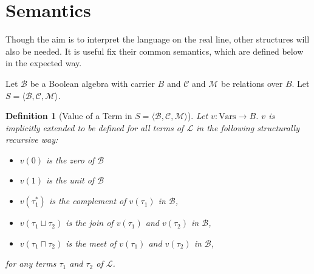 \documentclass{article}
\newtheorem*{definition}{Definition}
\newcommand{\B}{\mathcal{B}}
\newcommand{\lang}{\mathcal{L}}
\newcommand{\Vars}{\text{Vars}}
\newcommand{\lcup}{\sqcup}
\newcommand{\lcap}{\sqcap}
\newcommand{\lstar}{^*}
\begin{document}
\section{Semantics}

Though the aim is to interpret the language on the real line, other structures will also be needed. It is useful fix their common semantics, which are defined below in the expected way.

Let $\B$ be a Boolean algebra with carrier $B$ and $\mathcal{C}$ and $\mathcal{M}$ be relations over $B$. Let $S = \langle \B, \mathcal{C}, \mathcal{M} \rangle$.

\begin{definition}[Value of a Term in $S = \langle \B, \mathcal{C}, \mathcal{M} \rangle$]
  Let $v: \Vars \rightarrow B$. $v$ is implicitly extended to be defined for all terms of $\lang$ in the following structurally recursive way:
  \begin{itemize}
  \item $v(0)$ is the zero of $\B$
  \item $v(1)$ is the unit of $\B$
  \item $v(\tau_1 \lstar)$ is the complement of $v(\tau_1)$ in $\B$,
  \item $v(\tau_1 \lcup \tau_2)$ is the join of $v(\tau_1)$ and $v(\tau_2)$ in $\B$,
  \item $v(\tau_1 \lcap \tau_2)$ is the meet of $v(\tau_1)$ and $v(\tau_2)$ in $\B$,
  \end{itemize}
for any terms $\tau_1$ and $\tau_2$ of $\lang$.

\end{definition}
\end{document}
